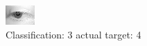 \begin{figure}[h!]
\begin{center}
\includegraphics[width=0.60\columnwidth]{figures/ID2602_class_3_target_4.png}
\end{center}
\caption{ Classification: 3 actual target: 4}
\label{fig:ID2602_class_3_target_4}
\end{figure}
